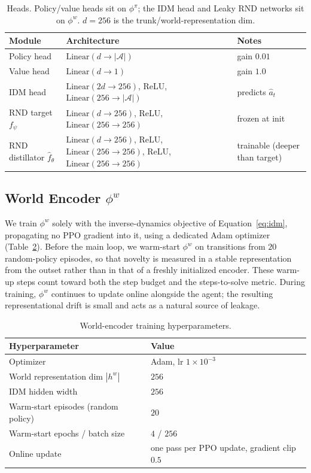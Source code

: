 \documentclass{article}
\begin{document}
\begin{table}[h]
\centering
\caption{Heads. Policy/value heads sit on $\phi^\pi$; the IDM head and Leaky RND
networks sit on $\phi^w$. $d=256$ is the trunk/world-representation dim.}
\label{tab:heads}
\begin{tabularx}{\linewidth}{l >{\raggedright\arraybackslash}X l}
\toprule
Module & Architecture & Notes \\
\midrule
Policy head        & $\text{Linear}(d\to|\mathcal{A}|)$ & gain $0.01$ \\
Value head         & $\text{Linear}(d\to 1)$            & gain $1.0$ \\
IDM head           & $\text{Linear}(2d\to256)$, ReLU, $\text{Linear}(256\to|\mathcal{A}|)$ & predicts $\hat a_t$ \\
RND target $f_\psi$      & $\text{Linear}(d\to256)$, ReLU, $\text{Linear}(256\to256)$ & frozen at init \\
RND distillator $\hat f_\theta$ & $\text{Linear}(d\to256)$, ReLU, $\text{Linear}(256\to256)$, ReLU, $\text{Linear}(256\to256)$ & trainable (deeper than target) \\
\bottomrule
\end{tabularx}
\end{table}

\subsection{World Encoder $\phi^w$}
\label{app:worldenc}
We train $\phi^w$ solely with the inverse-dynamics objective of
Equation~\eqref{eq:idm}, propagating no PPO gradient into it, using a dedicated
Adam optimizer (Table~\ref{tab:wenc}). Before the main loop, we warm-start
$\phi^w$ on transitions from $20$ random-policy episodes, so that novelty is
measured in a stable representation from the outset rather than in that of a
freshly initialized encoder. These warm-up steps count toward both the step
budget and the steps-to-solve metric. During training, $\phi^w$ continues to
update online alongside the agent; the resulting representational drift is small
and acts as a natural source of leakage.

\begin{table}[h]
\centering
\caption{World-encoder training hyperparameters.}
\label{tab:wenc}
\begin{tabular}{ll}
\toprule
Hyperparameter & Value \\
\midrule
Optimizer & Adam, lr $1\times10^{-3}$ \\
World representation dim $|h^w|$ & $256$ \\
IDM hidden width & $256$ \\
Warm-start episodes (random policy) & $20$ \\
Warm-start epochs / batch size & $4$ / $256$ \\
Online update & one pass per PPO update, gradient clip $0.5$ \\
\bottomrule
\end{tabular}
\end{table}
\end{document}
